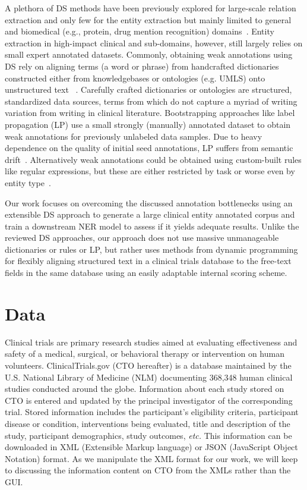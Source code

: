 \documentclass[letterpaper]{article} %
\begin{document}
A plethora of DS methods have been previously explored for large-scale relation extraction and only few for the entity extraction but mainly limited to general and biomedical (e.g., protein, drug mention recognition) domains~\cite{etzioni2008open,smirnova2018relation,adelani2020distant}.
Entity extraction in high-impact clinical and sub-domains, however, still largely relies on small expert annotated datasets.
Commonly, obtaining weak annotations using DS rely on aligning terms (a word or phrase) from handcrafted dictionaries constructed either from knowledgebases or ontologies (e.g. UMLS) onto unstructured text ~\citep{giannakopoulos2017unsupervised,yang2018distantly, ghiasvand2018learning,peng2019distantly,hedderich2021anea}.
Carefully crafted dictionaries or ontologies are structured, standardized data sources, terms from which do not capture a myriad of writing variation from writing in clinical literature.
Bootstrapping approaches like label propagation (LP) use a small strongly (manually) annotated dataset to obtain weak annotations for previously unlabeled data samples\cite{bing2017bootstrapping}.
Due to heavy dependence on the quality of initial seed annotations, LP suffers from semantic drift~\cite{komachi2008graph,nagesh2018keep}.
Alternatively weak annotations could be obtained using custom-built rules like regular expressions, but these are either restricted by task or worse even by entity type~\cite{ratner2017snorkel,safranchik2020weakly,fries2021ontology}.

Our work focuses on overcoming the discussed annotation bottlenecks using an extensible DS approach to generate a large clinical entity annotated corpus and train a downstream NER model to assess if it yields adequate results.
Unlike the reviewed DS approaches, our approach does not use massive unmanageable dictionaries or rules or LP, but rather uses methods from dynamic programming for flexibly aligning structured text in a clinical trials database to the free-text fields in the same database using an easily adaptable internal scoring scheme.
%
%
%
\section{Data}
\label{sec:data}
%
Clinical trials are primary research studies aimed at evaluating effectiveness and safety of a medical, surgical, or behavioral therapy or intervention on human volunteers.
ClinicalTrials.gov (CTO hereafter) is a database maintained by the U.S. National Library of Medicine (NLM) documenting 368,348 human clinical studies conducted around the globe.
Information about each study stored on CTO is entered and updated by the principal investigator of the corresponding trial.
Stored information includes the participant's eligibility criteria, participant disease or condition, interventions being evaluated, title and description of the study, participant demographics, study outcomes, \textit{etc.}
This information can be downloaded in XML (Extensible Markup language) or JSON (JavaScript Object Notation) format.
As we manipulate the XML format for our work, we will keep to discussing the information content on CTO from the XMLs rather than the GUI.
\end{document}
